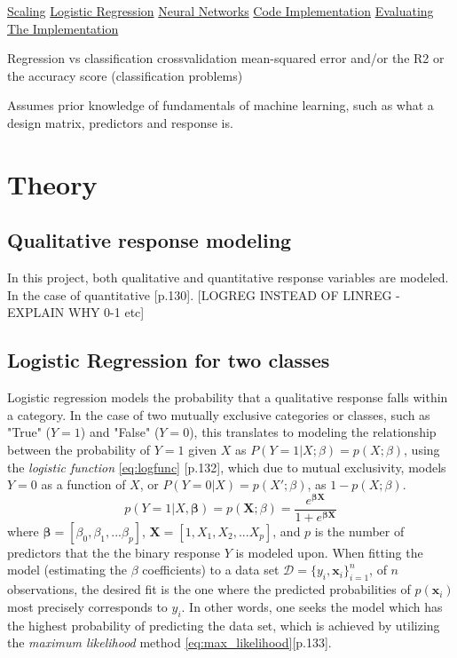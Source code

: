 \documentclass[%
oneside,                 %
final,                   %
10pt]{article}
\begin{document}
\hyperref[Section_M_Scaling]{Scaling}
\hyperref[Section_M_Logreg]{Logistic Regression}
\hyperref[Section_M_NN]{Neural Networks}
\hyperref[Section_M_Codeimpl]{Code Implementation}
\hyperref[Section_M_eval]{Evaluating The Implementation}

Regression vs classification
crossvalidation
mean-squared error and/or the R2
or the accuracy score (classification problems) 

Assumes prior knowledge of fundamentals of machine learning, such as what a design matrix, predictors and response is.
\section{Theory} \label{Section_Theory}

\subsection{Qualitative response modeling}
In this project, both qualitative and quantitative response variables are modeled.  In the case of quantitative \citep{2017introstatlearn}[p.130]. [LOGREG INSTEAD OF LINREG  -EXPLAIN WHY 0-1 etc]


\subsection{Logistic Regression for two classes} \label{Section_M_Logreg}
Logistic regression models the probability that a qualitative response falls within a category. In the case of two mutually exclusive categories or classes, such as "True" ($Y=1$) and "False" ($Y=0$), this translates to modeling the relationship between the probability of $Y=1$ given $X$ as $P(Y=1|X;\beta)=p(X;\beta)$, using the \textit{logistic function} \eqref{eq:logfunc} \citep{2017introstatlearn}[p.132], which due to mutual exclusivity, models $Y=0$ as a function of $X$, or $P(Y=0|X)=p(X';\beta)$, as $1-p(X;\beta)$.
\begin{equation}
p(Y=1|X, \bm{\beta})= p(\bm{X};{\beta})=\frac{e^{\bm{\beta}\bm{X}}}{1+e^{\bm{\beta}\bm{X}}}
\label{eq:logfunc}
\end{equation}
where $\bm{\beta}=[\beta_0, \beta_1, ... \beta_p]$, $\bm{X}=[1,X_1, X_2, ... X_p]$, and $p$ is the number of predictors that the the binary response $Y$ is modeled upon. When fitting the model (estimating the $\beta$ coefficients) to a data set $\mathcal{D}=\{y_i,\bm{x}_i\}_{i=1}^n$, of $n$ observations, the desired fit is the one where the predicted probabilities of $p(\bm{x}_i)$  most precisely corresponds to $y_i$. In other words, one seeks the model which has the highest probability of predicting the data set, which is achieved by utilizing the \textit{maximum likelihood} method \eqref{eq:max_likelihood}\citep{2017introstatlearn}[p.133]. 
\end{document}
